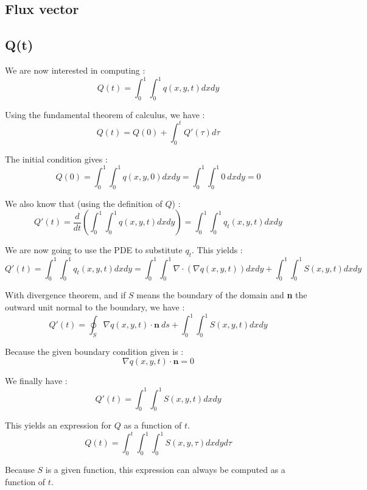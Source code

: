 \subsection{Flux vector}

\subsection{Q(t)}

We are now interested in computing : 
$$Q(t) = \int_0^1\int_0^1 q(x,y,t)dxdy$$

Using the fundamental theorem of calculus, we have :
$$Q(t) = Q(0) + \int_0^t Q'(\tau)d\tau$$

The initial condition gives :
$$Q(0) =\int_0^1\int_0^1 q(x,y,0)dxdy = \int_0^1\int_0^1 0 \: dxdy = 0$$

We also know that (using the definition of $Q$) :
$$Q'(t) = \frac{d}{dt}(\int_0^1\int_0^1 q(x,y,t)dxdy)=\int_0^1\int_0^1 q_t(x,y,t)dxdy$$

We are now going to use the PDE to substitute $q_t$. This yields :
$$Q'(t) = \int_0^1\int_0^1 q_t(x,y,t)dxdy = \int_0^1\int_0^1 \nabla \cdot (\nabla q(x,y,t))dxdy+\int_0^1\int_0^1 S(x,y,t) dxdy$$

With divergence theorem, and if $S$ means the boundary of the domain and \textbf{n} the outward unit normal to the boundary, we have : 
$$Q'(t) = \oint_S \nabla q(x,y,t)\cdot \textbf{n} \: ds + \int_0^1\int_0^1 S(x,y,t)dxdy$$

Because the given boundary condition given is :
$$\nabla q(x,y,t)\cdot \textbf{n} = 0$$

We finally have : 
$$Q'(t) = \int_0^1\int_0^1 S(x,y,t)dxdy$$

This yields an expression for $Q$ as a function of $t$.
$$Q(t) = \int_0^t\int_0^1\int_0^1 S(x,y,\tau)dxdyd\tau$$

Because $S$ is a given function, this expression can always be computed as a function of $t$.

